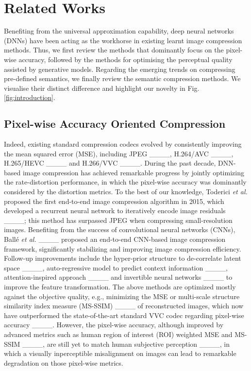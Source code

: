 \section{Related Works}
{Benefiting from the universal approximation capability, deep neural networks (DNNs) have been acting as the workhorse in existing learnt image compression methods. Thus, we first review the methods that dominantly focus on the pixel-wise accuracy, followed by the methods for optimising the perceptual quality assisted by generative models. Regarding the emerging trends on compressing pre-defined semantics, we finally review the semantic compression methods. We visualise their distinct difference and highlight our novelty  in Fig. \ref{fig:introduction}.}

\subsection{Pixel-wise Accuracy Oriented Compression}

{Indeed, existing standard compression codecs evolved by consistently improving the mean squared error (MSE), including JPEG ____, H.264/AVC ____, H.265/HEVC ____ and H.266/VVC ____. During the past decade, DNN-based image compression has achieved remarkable progress by jointly optimizing the rate-distortion performance, in which the pixel-wise accuracy was dominantly considered by the distortion metrics. To the best of our knowledge, Toderici \textit{et al.} proposed the first end-to-end image compression algorithm in 2015, which developed a recurrent neural network to iteratively encode image residuals ____; this method has surpassed JPEG when compressing small-resolution images. Benefiting from the success of convolutional neural networks (CNNs), Ball{\'e} \textit{et al.} ____ proposed an end-to-end CNN-based image compression framework, significantly stabilizing and improving image compression efficiency. Follow-up improvements include the hyper-prior structure to de-correlate latent space ____, auto-regressive model to predict context information ____, attention-inspired approach ____ and invertible neural networks ____ to improve the feature transformation. The above methods are optimized mostly against the objective quality, e.g., minimizing the MSE or multi-scale structure similarity index measure (MS-SSIM) ____ of reconstructed images, which now have outperformed the state-of-the-art standard VVC codec regarding pixel-wise accuracy ____. However, the pixel-wise accuracy, although improved by advanced metrics such as human region of interest (ROI) weighted MSE and MS-SSIM ____, are still yet to match human subjective perception ____, in which a visually inperceptible misalignment on images can lead to remarkable degradation on those pixel-wise metrics. }

